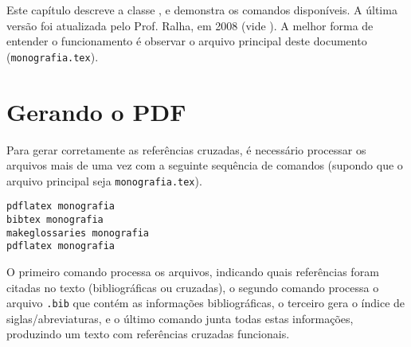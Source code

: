 \newcommand{\texCommand}[1]{\texttt{\textbackslash{#1}}}%

\newcommand{\exemplo}[1]{%
\vspace{\baselineskip}%
\noindent\fbox{\begin{minipage}{\textwidth}#1\end{minipage}}%
\\\vspace{\baselineskip}}%

\newcommand{\exemploVerbatim}[1]{%
\vspace{\baselineskip}%
\noindent\fbox{\begin{minipage}{\textwidth}%
#1\end{minipage}}%
\\\vspace{\baselineskip}}%


Este capítulo descreve a classe \unbcic, e demonstra os comandos disponíveis. A
última versão foi atualizada pelo Prof. Ralha, em 2008 (vide ).
A melhor forma de entender o funcionamento é observar o arquivo principal deste
documento (\texttt{monografia.tex}).

\section{Gerando o PDF}

Para gerar corretamente as referências cruzadas, é necessário processar os arquivos
mais de uma vez com a seguinte sequência de comandos (supondo que o arquivo
principal seja \texttt{monografia.tex}).

\begin{verbatim}
pdflatex monografia
bibtex monografia
makeglossaries monografia
pdflatex monografia
\end{verbatim}

O primeiro comando processa os arquivos, indicando quais referências foram citadas
no texto (bibliográficas ou cruzadas), o segundo comando processa o arquivo
\texttt{.bib} que contém as informações bibliográficas, o terceiro gera o índice
de siglas/abreviaturas, e o último comando junta todas estas informações,
produzindo um texto com referências cruzadas funcionais.



